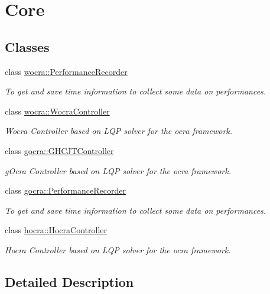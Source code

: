 \hypertarget{group__core}{}\section{Core}
\label{group__core}
\subsection*{Classes}
\begin{DoxyCompactItemize}
\item 
class \hyperlink{classwocra_1_1PerformanceRecorder}{wocra\+::\+Performance\+Recorder}
\begin{DoxyCompactList}\small\item\em To get and save time information to collect some data on performances. \end{DoxyCompactList}\item 
class \hyperlink{classwocra_1_1WocraController}{wocra\+::\+Wocra\+Controller}
\begin{DoxyCompactList}\small\item\em Wocra Controller based on L\+QP solver for the ocra framework. \end{DoxyCompactList}\item 
class \hyperlink{classgocra_1_1GHCJTController}{gocra\+::\+G\+H\+C\+J\+T\+Controller}
\begin{DoxyCompactList}\small\item\em g\+Ocra Controller based on L\+QP solver for the ocra framework. \end{DoxyCompactList}\item 
class \hyperlink{classgocra_1_1PerformanceRecorder}{gocra\+::\+Performance\+Recorder}
\begin{DoxyCompactList}\small\item\em To get and save time information to collect some data on performances. \end{DoxyCompactList}\item 
class \hyperlink{classhocra_1_1HocraController}{hocra\+::\+Hocra\+Controller}
\begin{DoxyCompactList}\small\item\em Hocra Controller based on L\+QP solver for the ocra framework. \end{DoxyCompactList}\end{DoxyCompactItemize}


\subsection{Detailed Description}
